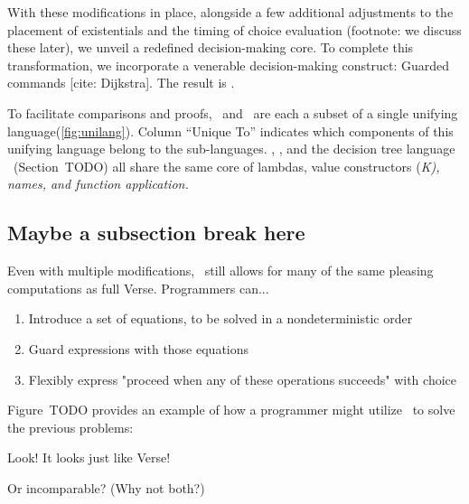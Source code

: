 \documentclass[manuscript,screen,review, 12pt]{acmart}
\begin{document}
        
        With these modifications in place, alongside a few additional
        adjustments to the placement of existentials and the timing of choice
        evaluation (footnote: we discuss these later), we unveil a redefined decision-making core. To complete this
        transformation, we incorporate a venerable decision-making construct:
        Guarded commands [cite: Dijkstra]. The result is \VMinus. 

    

    To facilitate comparisons and proofs, \VMinus\ and \PPlus\ are each a subset
    of a single unifying language(\cref{fig:unilang}). Column “Unique To” indicates
    which components of this unifying language belong to the sub-languages. 
    \PPlus, \VMinus, and the decision tree language \D\ (Section~TODO) all share 
    the same core of lambdas, value constructors (\it{K}), names, and function 
    application. 


    

    
    
    
    



    \subsection{Maybe a subsection break here}
    
    
    
    Even with multiple modifications, \VMinus\ still allows for many of the same
    pleasing computations as full Verse. Programmers can... 
        \begin{enumerate}
            \item Introduce a set of equations, to be solved in a nondeterministic order 
            \item Guard expressions with those equations 
            \item Flexibly express "proceed when any of these operations succeeds" with choice 
        \end{enumerate}

    Figure~TODO provides an example of how a programmer might utilize
    \VMinus\ to solve the previous problems:

    
    
    
    
    Look! It looks just like Verse! 
   
    
        Or incomparable? (Why not both?)
    
\end{document}
